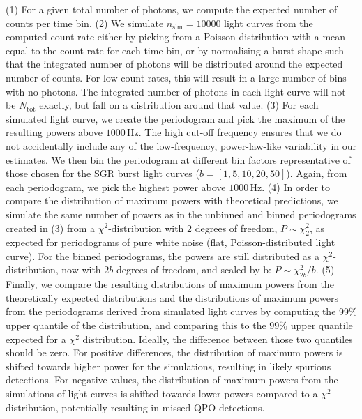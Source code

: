 \documentclass[numberedappendix]{emulateapj}
\newcommand{\hz}{\,\mathrm{Hz}}
\begin{document}
(1) For a given total number of photons, we compute the expected number of counts per time bin. 
(2) We simulate $n_{\mathrm{sim}} = 10000$ light curves from the computed count rate either by picking from a Poisson distribution with a mean equal to the count rate for each time bin, or by normalising a burst shape such that the integrated number of photons will be distributed around the expected number of counts. For low count rates, this will result in a large number of bins with no photons. The integrated number of photons in each light curve will not be $N_{\mathrm{tot}}$ exactly, but fall on a distribution around that value.
(3) For each simulated light curve, we create the periodogram and pick the maximum of the resulting powers above $1000 \hz$. The high cut-off frequency ensures that we do not accidentally include any of the low-frequency, power-law-like variability in our estimates. We then bin the periodogram at different bin factors representative of those chosen for the SGR burst light curves ($b = [1, 5, 10, 20, 50]$). Again, from each periodogram, we pick the highest power above $1000 \hz$.
(4) In order to compare the distribution of maximum powers with theoretical predictions, we simulate the same number of powers as in the unbinned and binned periodograms created in (3) from a $\chi^2$-distribution with $2$ degrees of freedom, $P \sim \chi^2_2$, as expected for periodograms of pure white noise (flat, Poisson-distributed light curve). For the binned periodograms, the powers are still distributed as a $\chi^2$-distribution, now with $2b$ degrees of freedom, and scaled by b: $P \sim \chi^2_{2b}/b$.
(5) Finally, we compare the resulting distributions of maximum powers from the theoretically expected distributions and the distributions of maximum powers from the periodograms derived from simulated light curves by computing the $99\%$ upper quantile of the distribution, and comparing this to the $99\%$ upper quantile expected for a $\chi^2$ distribution. Ideally, the difference between those two quantiles should be zero. For positive differences, the distribution of maximum powers is shifted towards higher power for the simulations, resulting in likely spurious detections. For negative values, the distribution of maximum powers from the simulations of light curves is shifted towards lower powers compared to a $\chi^2$ distribution, potentially resulting in missed QPO detections.
\end{document}
